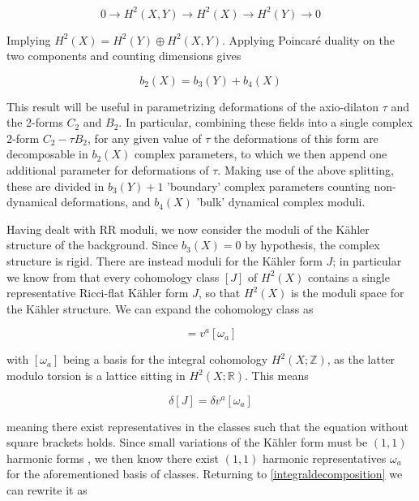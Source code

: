 \begin{equation}
	0 \rightarrow H^2(X,Y) \rightarrow H^2(X) \rightarrow H^2(Y) \rightarrow 0
\end{equation}

Implying $H^2(X) = H^2(Y) \oplus H^2(X,Y)$. Applying Poincaré duality on the two components and counting dimensions gives

\begin{equation}
	b_2(X) = b_3(Y) + b_4(X)
\end{equation}

This result will be useful in parametrizing deformations of the axio-dilaton $\tau$ and the 2-forms $C_2$ and $B_2$. In particular, combining these fields into a single complex $2$-form $C_2 - \tau B_2$, for any given value of $\tau$ the deformations of this form are decomposable in $b_2(X)$ complex parameters, to which we then append one additional parameter for deformations of $\tau$. Making use of the above splitting, these are divided in $b_3(Y) + 1$ 'boundary' complex parameters counting non-dynamical deformations, and $b_4(X)$ 'bulk' dynamical complex moduli.\\


Having dealt with RR moduli, we now consider the moduli of the K\"ahler structure of the background. Since $b_3(X) = 0$ by hypothesis, the complex structure is rigid. There are instead moduli for the K\"ahler form $J$; in particular we know from  that every cohomology class $[J]$ of $H^2(X)$ contains a single representative Ricci-flat K\"ahler form $J$, so that $H^2(X)$ is the moduli space for the K\"ahler structure. We can expand the cohomology class as

\begin{equation}
	[J] = v^a [\omega_a] \label{integraldecomposition}
\end{equation}

with $[\omega_a]$ being a basis for the integral cohomology $H^2(X;\mathbb Z)$, as the latter modulo torsion is a lattice sitting in $H^2(X;\mathbb R)$. This means

\begin{equation}
	\delta [J] = \delta v^a [\omega_a]
\end{equation}

meaning there exist representatives in the classes such that the equation without square brackets holds. Since small variations of the K\"ahler form must be $(1,1)$ harmonic forms , we then know there exist $(1,1)$ harmonic representatives $\omega_a$ for the aforementioned basis of classes. Returning to \ref{integraldecomposition} we can rewrite it as


